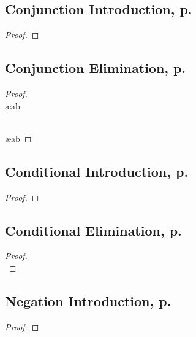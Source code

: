 \begin{multicols}{2}


\subsection{Conjunction Introduction, p.\ \pageref{conjint}}
\begin{proof}
	 
\end{proof}

\subsection{Conjunction Elimination, p.\ \pageref{conjelim}}
\begin{proof}
\\	 \ae{ab}

\\	 \ae{ab}
\end{proof}



\subsection{Conditional Introduction, p.\ \pageref{condint}}
\begin{proof}
	\open
	\close
\end{proof}

\subsection{Conditional Elimination, p.\ \pageref{condelim}}
\begin{proof}
\\	
	 
\end{proof}



\subsection{Negation Introduction, p.\ \pageref{negint}}

\begin{proof}
\open
\close
{}
\end{proof}



\end{multicols}
